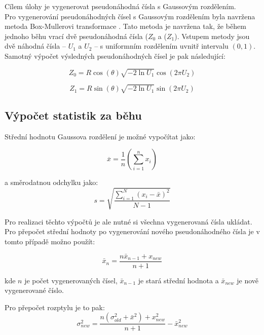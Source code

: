 \documentclass{article}
\begin{document}
Cílem úlohy je vygenerovat pseudonáhodná čísla s Gaussovým rozdělením. \\
Pro vygenerování pseudonáhodných čísel s Gaussovým rozdělením byla navržena metoda Box-Mullerovi transformace \cite{box1958note}.
Tato metoda je navržena tak, že během jednoho běhu vrací dvě pseudonáhodná čísla (\( Z_0 \) a (\( Z_1 \)). 
Vstupem metody jsou dvě náhodná čísla -- \( U_1 \) a \( U_2 \) -- s uniformním rozdělením uvnitř intervalu \( (0,1) \).
Samotný výpočet výsledných pseudonáhodných čísel je pak následující:


\begin{equation} 
Z_0 = R\cos{(\theta)} \sqrt{-2\ln{U_1}}\cos{(2\pi U_2)}
\end{equation}

\begin{equation} 
Z_1 = R\sin{(\theta)} \sqrt{-2\ln{U_1}}\sin{(2\pi U_2)}
\end{equation}

 \subsection{Výpočet statistik za běhu}

Střední hodnotu Gaussova rozdělení je možné vypočítat jako:

\begin{equation} 
\overline{x} = \frac{1}{n}(\sum_{i=1}^{n}x_i)
\end{equation}

a směrodatnou odchylku jako:
\begin{equation} 
s = \sqrt{\frac{\sum_{i=1}^{N}(x_i - \bar{x})^2}{N - 1}}
\end{equation}

Pro realizaci těchto výpočtů je ale nutné si všechna vygenerovaná čísla ukládat.
Pro přepočet střední hodnoty po vygenerování nového pseudonáhodného čísla je v tomto případě možno použít:

\begin{equation} 
\bar{x}_n = \frac{n\bar{x}_{n-1} + x_{new}}{n+1}
\end{equation}

kde \( n \) je počet vygenerovaných čísel, \( \bar{x}_{n-1} \) je stará střední hodnota a \( \bar{x}_{new} \)  je nově vygenerované číslo.

Pro přepočet rozptylu je to pak:
\begin{equation} 
\sigma^{2}_{new} = \frac{n(\sigma^{2}_{old}+ \bar{x}^2) + x^{2}_{new}}{n+1} - \bar{x}^{2}_{new} 
\end{equation}
\end{document}
